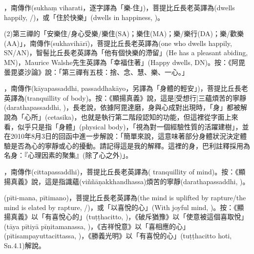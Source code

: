 \startitemgroup[noteitems]
\item{}，南傳作(sukhaṃ viharati，逐字譯為「樂-住」)，菩提比丘長老英譯為(dwells happily, /)，或「住於快樂」(dwells in happiness, )。
\item{}(2)第三禪的「安樂住/身心受樂/樂住(SA)；樂住(MA)；樂/樂行(DA)；樂/歡樂(AA)」，南傳作(sukhavihārī)，菩提比丘長老英譯為(one who dwells happily, SN/AN)，智髻比丘長老英譯為「他有個快樂的滯留」(He has a pleasant abiding, MN)，Maurice Walshe先生英譯為「幸福住著」(Happy dwells, DN)。按：《阿毘曇毘婆沙論》說：「第三禪有五枝：捨、念、慧、樂、一心。」
\stopitemgroup

\startitemgroup[noteitems]
\item{}，南傳作(kāyapassaddhi, passaddhakāyo，另譯為「身體的輕安」)，菩提比丘長老英譯為(tranquillity of body)。按：《顯揚真義》說，這是[受想行]三蘊煩苦的寧靜(darathapassaddhi, )，長老說，依據阿毘達磨，身與心成對出現時，「身」都被解說為「心所」(cetasika)，也就是執行第二階段認知的功能，但這裡從字面上來看，似乎只是指「身體」(physical body)，「視為對一個經驗性質的活躍建樹」，並在2010年8月3日的回函中進一步解說：「簡單來說，這意味著部分身體狀況決定體驗是否為心的寧靜或心的擾動。請記得這是我的解釋。這裡的身，巴利註釋採用為名身：『心理因素的聚集』(除了心之外)」。
\stopitemgroup

\startitemgroup[noteitems]
\item{}，南傳作(cittapassaddhi)，菩提比丘長老英譯為( tranquillity of mind)。按：《顯揚真義》說，這是指識蘊(viññāṇakkhandhassa)煩苦的寧靜(darathapassaddhi, )。
\stopitemgroup

\startitemgroup[noteitems]
\item{}(pīti-mana, pītimano)，菩提比丘長老英譯為(the mind is uplifted by rapture/the mind is elated by rapture, /)，或「以喜悅的心」(With joyful mind, )。按：《顯揚真義》以「有喜悅心的」(tuṭṭhacitto, )，《破斥猶豫》以「使意被這個喜取悅」(tāya pītiyā pīṇitamanassa, )，《吉祥悅意》以「喜相應的心」(pītisampayuttacittassa, )，《勝義光明》以「有喜悅的心」(tuṭṭhacitto hoti, Sn.4.1)解說。
\stopitemgroup

